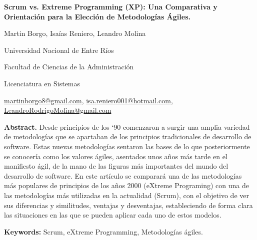 \documentclass[a4paper,10pt]{article}
\begin{document}
	\pagestyle{empty}
	\begin{titlepage}
		\centering
		\vspace*{1.5cm}
		{\fontsize{14}{17}\bfseries Scrum vs. Extreme Programming (XP): Una Comparativa y Orientación para la Elección de Metodologías Ágiles.\par}
		{\small Martin Borgo, Isaías Reniero, Leandro Molina\par}
		{\normalsize Universidad Nacional de Entre Ríos\par}
		{\normalsize Facultad de Ciencias de la Administración\par}
		{\normalsize Licenciatura en Sistemas\par}
		{\small \href{mailto:martinborgo8@gmail.com}{martinborgo8@gmail.com}, \href{mailto:isa.reniero001@hotmail.com}{isa.reniero001@hotmail.com}, \href{mailto:LeandroRodrigoMolina@gmail.com}{LeandroRodrigoMolina@gmail.com}\par}
		{\small \justify\textbf{Abstract.} Desde principios de los ‘90 comenzaron a surgir una amplia variedad de metodologías que se apartaban de los principios tradicionales de desarrollo de software. Estas nuevas metodologías sentaron las bases de lo que posteriormente se conocería como los valores ágiles, asentados unos años más tarde en el manifiesto ágil, de la mano de las figuras más importantes del mundo del desarrollo de software. En este artículo se comparará una de las metodologías más populares de principios de los años 2000 (eXtreme Programing) con una de las metodologías más utilizadas en la actualidad (Scrum), con el objetivo de ver sus diferencias y similitudes, ventajas y desventajas, estableciendo de forma clara las situaciones en las que se pueden aplicar cada uno de estos modelos.\par}
		
		{\small \justify\textbf{Keywords:} Scrum, eXtreme Programming, Metodologías ágiles. \par}
	\end{titlepage}
	
\end{document}
